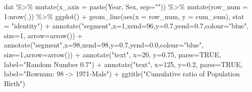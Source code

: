 \documentclass[
]{book}
\newenvironment{Shaded}{\begin{snugshade}}{\end{snugshade}}
\newcommand{\AttributeTok}[1]{\textcolor[rgb]{0.77,0.63,0.00}{#1}}
\newcommand{\ConstantTok}[1]{\textcolor[rgb]{0.00,0.00,0.00}{#1}}
\newcommand{\DecValTok}[1]{\textcolor[rgb]{0.00,0.00,0.81}{#1}}
\newcommand{\FloatTok}[1]{\textcolor[rgb]{0.00,0.00,0.81}{#1}}
\newcommand{\FunctionTok}[1]{\textcolor[rgb]{0.00,0.00,0.00}{#1}}
\newcommand{\NormalTok}[1]{#1}
\newcommand{\SpecialCharTok}[1]{\textcolor[rgb]{0.00,0.00,0.00}{#1}}
\newcommand{\StringTok}[1]{\textcolor[rgb]{0.31,0.60,0.02}{#1}}
\begin{document}
\begin{Shaded}
\begin{Highlighting}[]
\NormalTok{dat }\SpecialCharTok{\%\textgreater{}\%} 
        \FunctionTok{mutate}\NormalTok{(}\AttributeTok{x\_axis =} \FunctionTok{paste}\NormalTok{(Year, Sex, }\AttributeTok{sep=}\StringTok{""}\NormalTok{)) }\SpecialCharTok{\%\textgreater{}\%} 
        \FunctionTok{mutate}\NormalTok{(}\AttributeTok{row\_num =} \DecValTok{1}\SpecialCharTok{:}\FunctionTok{nrow}\NormalTok{(.)) }\SpecialCharTok{\%\textgreater{}\%} 
        \FunctionTok{ggplot}\NormalTok{() }\SpecialCharTok{+} 
        \FunctionTok{geom\_line}\NormalTok{(}\FunctionTok{aes}\NormalTok{(}\AttributeTok{x =}\NormalTok{ row\_num, }\AttributeTok{y =}\NormalTok{ cum\_sum), }\AttributeTok{stat =} \StringTok{"identity"}\NormalTok{) }\SpecialCharTok{+}
        \FunctionTok{annotate}\NormalTok{(}\StringTok{"segment"}\NormalTok{,}\AttributeTok{x=}\DecValTok{1}\NormalTok{,}\AttributeTok{xend=}\DecValTok{96}\NormalTok{,}\AttributeTok{y=}\FloatTok{0.7}\NormalTok{,}\AttributeTok{yend=}\FloatTok{0.7}\NormalTok{,}\AttributeTok{colour=}\StringTok{"blue"}\NormalTok{,}
             \AttributeTok{size=}\DecValTok{1}\NormalTok{, }\AttributeTok{arrow=}\FunctionTok{arrow}\NormalTok{()) }\SpecialCharTok{+} 
        \FunctionTok{annotate}\NormalTok{(}\StringTok{"segment"}\NormalTok{,}\AttributeTok{x=}\DecValTok{98}\NormalTok{,}\AttributeTok{xend=}\DecValTok{98}\NormalTok{,}\AttributeTok{y=}\FloatTok{0.7}\NormalTok{,}\AttributeTok{yend=}\FloatTok{0.0}\NormalTok{,}\AttributeTok{colour=}\StringTok{"blue"}\NormalTok{,}
                    \AttributeTok{size=}\DecValTok{1}\NormalTok{,}\AttributeTok{arrow=}\FunctionTok{arrow}\NormalTok{()) }\SpecialCharTok{+} 
        \FunctionTok{annotate}\NormalTok{(}\StringTok{"text"}\NormalTok{, }\AttributeTok{x=}\DecValTok{20}\NormalTok{, }\AttributeTok{y=}\FloatTok{0.75}\NormalTok{, }\AttributeTok{parse=}\ConstantTok{TRUE}\NormalTok{, }\AttributeTok{label=}\StringTok{"\textquotesingle{}Random Number 0.7\textquotesingle{}"}\NormalTok{) }\SpecialCharTok{+}
        \FunctionTok{annotate}\NormalTok{(}\StringTok{"text"}\NormalTok{, }\AttributeTok{x=}\DecValTok{125}\NormalTok{, }\AttributeTok{y=}\FloatTok{0.2}\NormalTok{, }\AttributeTok{parse=}\ConstantTok{TRUE}\NormalTok{, }\AttributeTok{label=}\StringTok{"\textquotesingle{}Rownum: 98 {-}\textgreater{} 1971{-}Male\textquotesingle{}"}\NormalTok{) }\SpecialCharTok{+}
        \FunctionTok{ggtitle}\NormalTok{(}\StringTok{"Cumulative ratio of Population Birth"}\NormalTok{)}
\end{Highlighting}
\end{Shaded}
\end{document}
